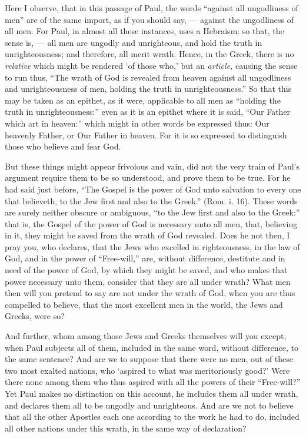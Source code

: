 Here I observe, that in this passage of Paul, the words “against all ungodliness of men” are of the same import, as if you should say, — against the ungodliness of all men. For Paul, in almost all these instances, uses a Hebraism: so that, the sense is, — all men are ungodly and unrighteous, and hold the truth in unrighteousness; and therefore, all merit wrath. Hence, in the Greek, there is no \emph{relative }which might be rendered ‘of those who,’ but an \emph{article, }causing the sense to run thus, “The wrath of God is revealed from heaven against all ungodliness and unrighteousness of men, holding the truth in unrighteousness.” So that this may be taken as an epithet, as it were, applicable to all men as “holding the truth in unrighteousness:” even as it is an epithet where it is said, “Our Father which art in heaven:” which might in other words be expressed thus: Our heavenly Father, or Our Father in heaven. For it is so expressed to distinguish those who believe and fear God.

But these things might appear frivolous and vain, did not the very train of Paul’s argument require them to be so understood, and prove them to be true. For he had said just before, “The Gospel is the power of God unto salvation to every one that believeth, to the Jew first and also to the Greek.” (Rom. i. 16). These words are surely neither obscure or ambiguous, “to the Jew first and also to the Greek:” that is, the Gospel of the power of God is necessary unto all men, that, believing in it, they might be saved from the wrath of God revealed. Does he not then, I pray you, who declares, that the Jews who excelled in righteousness, in the law of God, and in the power of “Free-will,” are, without difference, destitute and in need of the power of God, by which they might be saved, and who makes that power necessary unto them, consider that they are all under wrath? What men then will you pretend to say are not under the wrath of God, when you are thus compelled to believe, that the most excellent men in the world, the Jews and Greeks, were so?

And further, whom among those Jews and Greeks themselves will you except, when Paul subjects all of them, included in the same word, without difference, to the same sentence? And are we to suppose that there were no men, out of these two most exalted nations, who ‘aspired to what was meritoriously good?’ Were there none among them who thus aspired with all the powers of their “Free-will?” Yet Paul makes no distinction on this account, he includes them all under wrath, and declares them all to be ungodly and unrighteous. And are we not to believe that all the other Apostles each one according to the work he had to do, included all other nations under this wrath, in the same way of declaration?


